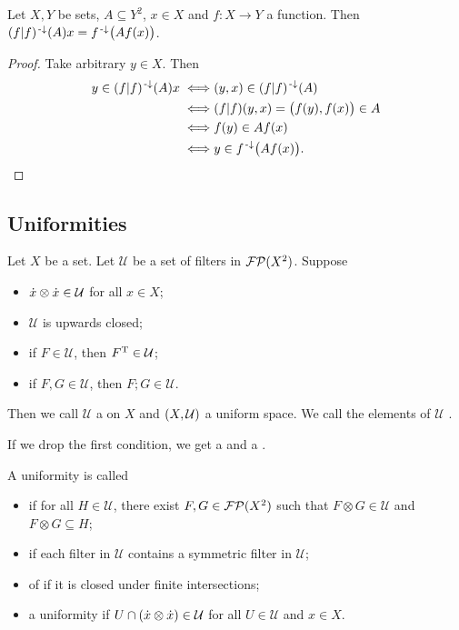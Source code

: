 \begin{lemma} \label{principalImageUnderRelationMapping}
Let $X, Y$ be sets, $A\subseteq Y^2$, $x\in X$ and $f: X\to Y$ a function. Then $(f|f)^{\text{\hspace{0.15em}-}\downarrow}(A)x = f^{\text{\hspace{0.15em}-}\downarrow}\big(Af(x)\big)$.
\end{lemma}
\begin{proof}
Take arbitrary $y \in X$. Then
\begin{align*}
y \in (f|f)^{\text{\hspace{0.15em}-}\downarrow}(A)x \iff& (y,x)\in (f|f)^{\text{\hspace{0.15em}-}\downarrow}(A) \\
\iff& (f|f)(y,x) = \big(f(y), f(x)\big) \in A \\
\iff& f(y) \in Af(x) \\
\iff& y \in f^{\text{\hspace{0.15em}-}\downarrow}\big(Af(x)\big).
\end{align*}
\end{proof}

\subsection{Uniformities}
\begin{definition}
Let $X$ be a set. Let $\mathcal{U}$ be a set of filters in $\operatorname{\mathcal{FP}}(X^2)$. Suppose
\begin{itemize}
\item $\dot{x}\otimes \dot{x} \in \mathcal{U}$ for all $x\in X$;
\item $\mathcal{U}$ is upwards closed;
\item if $F\in \mathcal{U}$, then $F^{\mathrm{T}}\in\mathcal{U}$;
\item if $F, G\in \mathcal{U}$, then $F;G\in\mathcal{U}$.
\end{itemize}
Then we call $\mathcal{U}$ a  on $X$ and $\sSet{X,\mathcal{U}}$ a uniform space. We call the elements of $\mathcal{U}$ .

If we drop the first condition, we get a  and a .

A uniformity is called 
\begin{itemize}
\item {} if for all $H\in\mathcal{U}$, there exist $F,G\in \operatorname{\mathcal{FP}}(X^2)$ such that $F\otimes G \in\mathcal{U}$ and $F\otimes G\subseteq H$;
\item {} if each filter in $\mathcal{U}$ contains a symmetric filter in $\mathcal{U}$;
\item of  if it is closed under finite intersections;
\item a  uniformity if $U\cap (\dot{x}\otimes \dot{x})\in \mathcal{U}$ for all $U\in \mathcal{U}$ and $x\in X$.
\end{itemize}
\end{definition}

